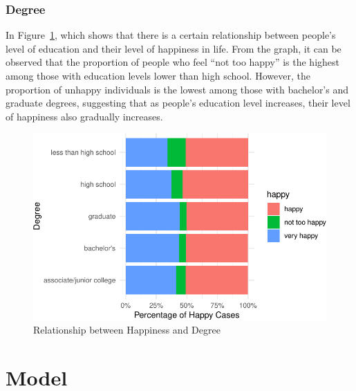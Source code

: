 \documentclass[
  letterpaper,
  DIV=11,
  numbers=noendperiod]{scrartcl}
\begin{document}
\hypertarget{degree}{%
\subsubsection{Degree}\label{degree}}

In Figure~\ref{fig-nine}, which shows that there is a certain
relationship between people's level of education and their level of
happiness in life. From the graph, it can be observed that the
proportion of people who feel ``not too happy'' is the highest among
those with education levels lower than high school. However, the
proportion of unhappy individuals is the lowest among those with
bachelor's and graduate degrees, suggesting that as people's education
level increases, their level of happiness also gradually increases.

\begin{figure}

{\centering \includegraphics{paper_files/figure-pdf/fig-nine-1.pdf}

}

\caption{\label{fig-nine}Relationship between Happiness and Degree}

\end{figure}

\hypertarget{model}{%
\section{Model}\label{model}}
\end{document}
